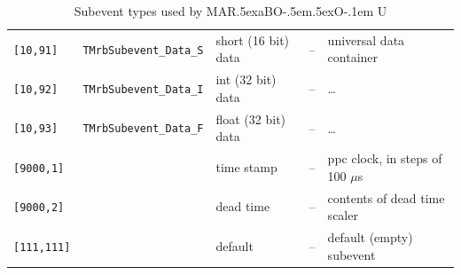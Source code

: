 \documentclass[10pt]{article}
\def\MARaBOU{MAR\lower.5ex\hbox{a}BO\kern-.5em\lower.5ex\hbox{O}\kern-.1em U}%
\begin{document}
\begin{table}
\begin{center}
\begin{tabular}{|l|l|l|l|l|}
\hline
\verb+[10,91]+ & \verb+TMrbSubevent_Data_S+ & short (16 bit) data & -- & universal data container \\
\verb+[10,92]+ & \verb+TMrbSubevent_Data_I+ & int (32 bit) data & -- & \dots \\
\verb+[10,93]+ & \verb+TMrbSubevent_Data_F+ & float (32 bit) data & -- & \dots \\
\hline
\verb+[9000,1]+ & & time stamp & -- &  ppc clock, in steps of 100 $\mu$s \\
\verb+[9000,2]+ & & dead time & -- &  contents of dead time scaler \\
\verb+[111,111]+ & & default & -- & default (empty) subevent \\
\hline
\end{tabular} 
\caption{Subevent types used by \MARaBOU{}}
\label{MarabouSubevents}\end{center}
\end{table}
\end{document}
